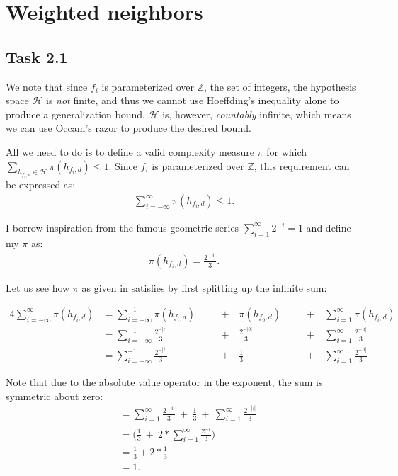 \newpage
\section{Weighted neighbors}

\newcommand{\Z}{\mathbb Z}
\newcommand{\hf}{h_{f_{i}, d}}
\newcommand{\hfd}{h_{f_{i}, d_{j}}}

\subsection{Task 2.1}

We note that since $f_i$ is parameterized over $\Z$, the set of integers, the
hypothesis space $\mathcal H$ is \emph{not} finite, and thus we cannot use
Hoeffding's inequality alone to produce a generalization bound. $\mathcal H$ is,
however, \emph{countably} infinite, which means we can use Occam's razor to
produce the desired bound.

All we need to do is to define a valid complexity measure $\pi$ for
which $\sum_{\hf \in \mathcal H} \pi(\hf) \leq 1$. Since $f_i$ is
parameterized over $\Z$, this requirement can be expressed as:
\begin{align}
  \sum_{i = -\infty}^\infty \pi(\hf) \leq 1.\label{eq:pi_req}
\end{align}

I borrow inspiration from the famous geometric series $\sum_{i = 1}^\infty
2^{-i} = 1$ and define my $\pi$ as:
\begin{align}
  \pi(\hf) = \frac{2^{-|i|}}{3}.\label{eq:my_pi}
\end{align}

Let us see how $\pi$ as given in  satisfies  by
first splitting up the infinite sum:

\begin{alignat*}{4}
  \sum_{i = -\infty}^\infty\pi(\hf) &= \sum_{i = -\infty}^{-1}\pi(\hf)\quad
  &&+\quad \pi(h_{f_0, d}) \quad &&+\quad \sum_{i = 1}^\infty \pi(\hf)\\[4pt]
  &= \sum_{i = -\infty}^{-1}\frac{2^{-|i|}}{3}\quad &&+\quad \frac{2^{-|0|}}{3}
  \quad &&+\quad \sum_{i = 1}^\infty \frac{2^{-|i|}}{3}\\[4pt]
  &= \sum_{i = -\infty}^{-1}\frac{2^{-|i|}}{3}\quad &&+\quad \frac{1}{3} \quad &&+\quad \sum_{i = 1}^\infty \frac{2^{-|i|}}{3}
\end{alignat*}

Note that due to the absolute value operator in the exponent, the sum is
symmetric about zero:
\begin{align*}
  &= \sum_{i = 1}^{\infty}\frac{2^{-|i|}}{3}\ +\ \frac{1}{3} \ +\ \sum_{i = 1}^\infty \frac{2^{-|i|}}{3}\\
  &= \Big(\frac{1}{3}\ +\ 2 * \sum_{i = 1}^{\infty}\frac{2^{-i}}{3}\Big)\\
  &= \frac{1}{3} + 2 * \frac{1}{3}\\[4pt]
  &= 1.
\end{align*}


